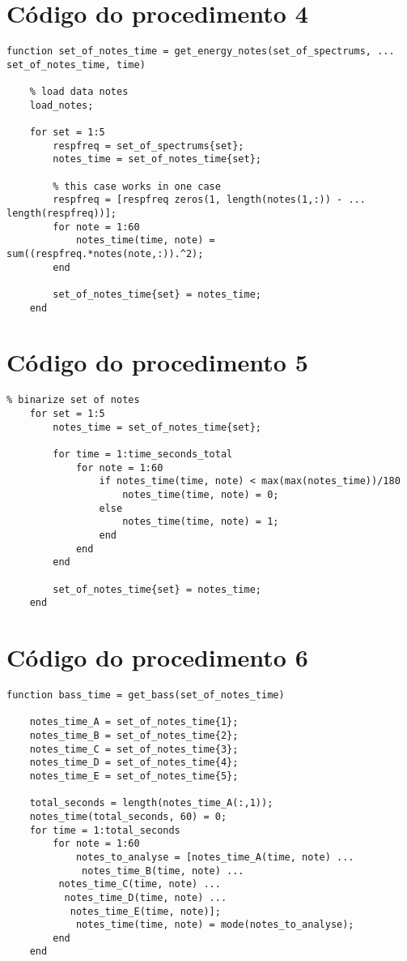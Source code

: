 \begin{apendicesenv}
\section{Código do procedimento 4}
\label{sec:codigo_procedimento_4}
\begin{lstlisting}
function set_of_notes_time = get_energy_notes(set_of_spectrums, ...
set_of_notes_time, time)
	
	% load data notes
	load_notes;

	for set = 1:5
		respfreq = set_of_spectrums{set};
		notes_time = set_of_notes_time{set};

		% this case works in one case
		respfreq = [respfreq zeros(1, length(notes(1,:)) - ...
length(respfreq))];
		for note = 1:60
	        notes_time(time, note) = sum((respfreq.*notes(note,:)).^2);    
		end	

		set_of_notes_time{set} = notes_time;
	end
\end{lstlisting}

\section{Código do procedimento 5}
\label{sec:codigo_procedimento_5}
\begin{lstlisting}
% binarize set of notes
    for set = 1:5
        notes_time = set_of_notes_time{set};
        
        for time = 1:time_seconds_total
            for note = 1:60
                if notes_time(time, note) < max(max(notes_time))/180
                    notes_time(time, note) = 0;
                else
                    notes_time(time, note) = 1;
                end
            end
        end

        set_of_notes_time{set} = notes_time;
    end
\end{lstlisting}

\section{Código do procedimento 6}
\label{sec:codigo_procedimento_6}
\begin{lstlisting}
function bass_time = get_bass(set_of_notes_time)

	notes_time_A = set_of_notes_time{1};
	notes_time_B = set_of_notes_time{2};
	notes_time_C = set_of_notes_time{3};
	notes_time_D = set_of_notes_time{4};
	notes_time_E = set_of_notes_time{5};

	total_seconds = length(notes_time_A(:,1));
	notes_time(total_seconds, 60) = 0;
	for time = 1:total_seconds
		for note = 1:60
			notes_to_analyse = [notes_time_A(time, note) ...
			 notes_time_B(time, note) ...
		 notes_time_C(time, note) ...
		  notes_time_D(time, note) ...
		   notes_time_E(time, note)];
			notes_time(time, note) = mode(notes_to_analyse);
		end
	end


\end{lstlisting}
\end{apendicesenv}
